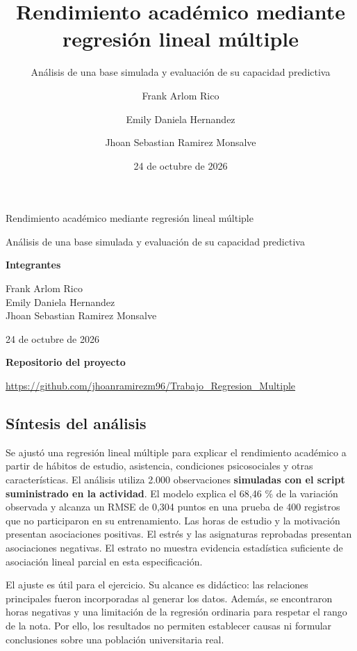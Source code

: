 \documentclass[
  11pt,
  letterpaper,
]{article}
\title{Rendimiento académico mediante regresión lineal múltiple}
\subtitle{Análisis de una base simulada y evaluación de su capacidad
predictiva}
\author{Frank Arlom Rico \and Emily Daniela Hernandez \and Jhoan
Sebastian Ramirez Monsalve}
\date{24 de octubre de 2026}
\begin{document}
\thispagestyle{plain}
\begin{center}
{\Large Rendimiento académico mediante regresión lineal múltiple\par}
\vspace{4pt}
{\normalsize Análisis de una base simulada y evaluación de su capacidad predictiva\par}
\vspace{10pt}
{\normalsize\textbf{Integrantes}\par}
Frank Arlom Rico\\
Emily Daniela Hernandez\\
Jhoan Sebastian Ramirez Monsalve
\par\vspace{8pt}
{\small 24 de octubre de 2026\par}
\vspace{4pt}
{\small\textbf{Repositorio del proyecto}\par}
{\footnotesize\url{https://github.com/jhoanramirezm96/Trabajo_Regresion_Multiple}\par}
\end{center}
\vspace{3pt}


\hypertarget{suxedntesis-del-anuxe1lisis}{%
\subsection{Síntesis del análisis}\label{suxedntesis-del-anuxe1lisis}}

Se ajustó una regresión lineal múltiple para explicar el rendimiento
académico a partir de hábitos de estudio, asistencia, condiciones
psicosociales y otras características. El análisis utiliza 2.000
observaciones \textbf{simuladas con el script suministrado en la
actividad}. El modelo explica el 68,46 \% de la variación observada y
alcanza un RMSE de 0,304 puntos en una prueba de 400 registros que no
participaron en su entrenamiento. Las horas de estudio y la motivación
presentan asociaciones positivas. El estrés y las asignaturas reprobadas
presentan asociaciones negativas. El estrato no muestra evidencia
estadística suficiente de asociación lineal parcial en esta
especificación.

El ajuste es útil para el ejercicio. Su alcance es didáctico: las
relaciones principales fueron incorporadas al generar los datos. Además,
se encontraron horas negativas y una limitación de la regresión
ordinaria para respetar el rango de la nota. Por ello, los resultados no
permiten establecer causas ni formular conclusiones sobre una población
universitaria real.
\end{document}
